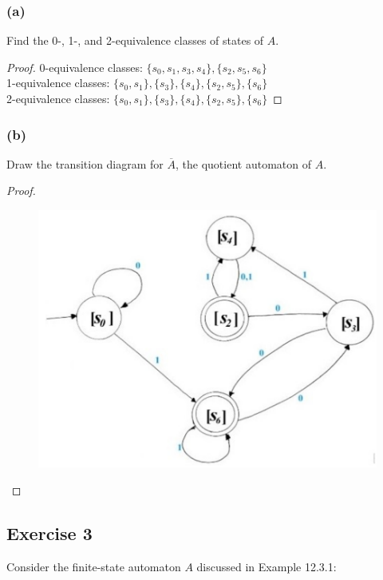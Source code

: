 \documentclass[14pt]{extarticle}
\begin{document}
\subsubsection{(a)}
Find the 0-, 1-, and 2-equivalence classes of states of \(A\).
\begin{proof}
    0-equivalence classes: \(\{s_0, s_1, s_3, s_4\}, \{s_2, s_5, s_6\}\) \\
    1-equivalence classes: \(\{s_0, s_1\}, \{s_3\}, \{s_4\}, \{s_2, s_5\}, \{s_6\}\) \\
    2-equivalence classes: \(\{s_0, s_1\}, \{s_3\}, \{s_4\}, \{s_2, s_5\}, \{s_6\}\)
\end{proof}

\subsubsection{(b)}
Draw the transition diagram for \(\overline{A}\), the quotient automaton of \(A\).

\begin{proof}
    \begin{figure}[ht!]
        \centering
        \includegraphics[scale=0.3]{../images/12.3.2.b.png}
    \end{figure}
\end{proof}

\subsection{Exercise 3}
Consider the finite-state automaton \(A\) discussed in Example 12.3.1:
\end{document}
